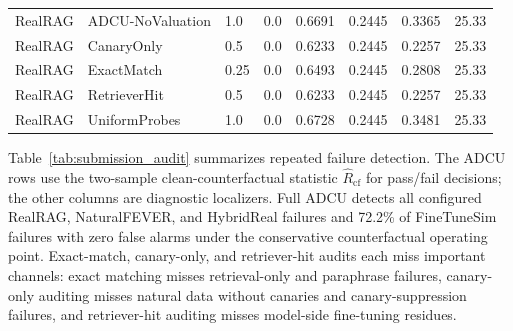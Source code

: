 \documentclass[10pt,journal,compsoc]{IEEEtran}
\newcommand{\method}{ADCU}
\begin{document}
\begin{table}[t]
{\begin{tabular}{llllllll}
RealRAG & ADCU-NoValuation & 1.0 & 0.0 & 0.6691 & 0.2445 & 0.3365 & 25.33 \\
RealRAG & CanaryOnly & 0.5 & 0.0 & 0.6233 & 0.2445 & 0.2257 & 25.33 \\
RealRAG & ExactMatch & 0.25 & 0.0 & 0.6493 & 0.2445 & 0.2808 & 25.33 \\
RealRAG & RetrieverHit & 0.5 & 0.0 & 0.6233 & 0.2445 & 0.2257 & 25.33 \\
RealRAG & UniformProbes & 1.0 & 0.0 & 0.6728 & 0.2445 & 0.3481 & 25.33 \\
\bottomrule
\end{tabular}%
}
\end{table}


Table~\ref{tab:submission_audit} summarizes repeated failure detection. The \method{} rows use the two-sample clean-counterfactual statistic $\hat R_{\mathrm{cf}}$ for pass/fail decisions; the other columns are diagnostic localizers. Full \method{} detects all configured RealRAG, NaturalFEVER, and HybridReal failures and 72.2\% of FineTuneSim failures with zero false alarms under the conservative counterfactual operating point. Exact-match, canary-only, and retriever-hit audits each miss important channels: exact matching misses retrieval-only and paraphrase failures, canary-only auditing misses natural data without canaries and canary-suppression failures, and retriever-hit auditing misses model-side fine-tuning residues.

\begin{table}[t]
\centering
\caption{Headline counterfactual deletion results using the two-sample $\hat R_{\mathrm{cf}}$ statistic.}
\label{tab:cf_headline}
\end{table}
\end{document}
